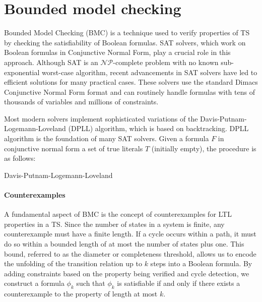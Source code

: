 \section{Bounded model checking}

Bounded Model Checking (BMC) is a technique used to verify properties of TS by checking the satisfiability of Boolean formulas. 
SAT solvers, which work on Boolean formulas in Conjunctive Normal Form, play a crucial role in this approach. 
Although SAT is an $\mathcal{NP}$-complete problem with no known sub-exponential worst-case algorithm, recent advancements in SAT solvers have led to efficient solutions for many practical cases. 
These solvers use the standard Dimacs Conjunctive Normal Form format and can routinely handle formulas with tens of thousands of variables and millions of constraints. 

Most modern solvers implement sophisticated variations of the Davis-Putnam-Logemann-Loveland (DPLL) algorithm, which is based on backtracking.
DPLL algorithm is the foundation of many SAT solvers.
Given a formula $F$ in conjunctive normal form a set of true literals $T$ (initially empty), the procedure is as follows:
\begin{algorithm}[H]
    \caption{Davis-Putnam-Logemann-Loveland}
\end{algorithm}

\paragraph*{Counterexamples}
A fundamental aspect of BMC is the concept of counterexamples for LTL properties in a TS. 
Since the number of states in a system is finite, any counterexample must have a finite length.
If a cycle occurs within a path, it must do so within a bounded length of at most the number of states plus one. 
This bound, referred to as the diameter or completeness threshold, allows us to encode the unfolding of the transition relation up to $k$ steps into a Boolean formula. 
By adding constraints based on the property being verified and cycle detection, we construct a formula $\phi_k$ such that $\phi_k$ is satisfiable if and only if there exists a counterexample to the property of length at most $k$.

